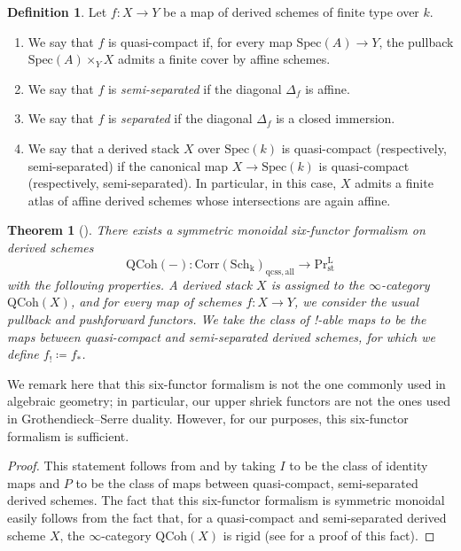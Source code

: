 \documentclass[oneside, hidelinks, 12pt, a4paper,reqno]{amsart}
\theoremstyle{plain}
\newtheorem{theorem}{Theorem}[section]
\theoremstyle{definition}
\newtheorem{definition}[definition]{Definition}
\theoremstyle{plain}
\newcommand{\rL}{\mathrm L}
\newcommand{\Spec}{\mathrm{Spec}}
\newcommand{\cat}{$\infty$-category }
\newcommand{\LPr}{\mathrm{Pr}^\rL}
\newcommand{\Qcoh}{\mathrm{QCoh}}
\begin{document}
\begin{definition}
    Let $f\colon X \to Y$ be a map of derived schemes of finite type over $k$. 
    \begin{enumerate}
        \item We say that $f$ is quasi-compact if, for every map $\Spec(A) \to Y$, the pullback $\Spec(A)\times_{Y}X$ admits a finite cover by affine schemes.
        \item We say that $f$ is \emph{semi-separated} if the diagonal $\Delta_f$ is affine.
        \item We say that $f$ is \emph{separated} if the diagonal $\Delta_f$ is a closed immersion. 
        \item We say that a derived stack $X$ over $\Spec(k)$ is quasi-compact (respectively, semi-separated) if the canonical map $X \to \Spec(k)$ is quasi-compact (respectively, semi-separated). In particular, in this case, $X$ admits a finite atlas of affine derived schemes whose intersections are again affine.
    \end{enumerate}
\end{definition}

\begin{theorem}[{\cite[Theorem 8.11]{scholze2025sixfunctorformalisms}}]
\label{thm:6-functor-for-qc-qs-schemes}
    There exists a symmetric monoidal six-functor formalism on derived schemes
    \[
    \Qcoh(-)\colon \mathrm{Corr(Sch_{k})}_{\mathrm{qcss, all}} \to \LPr_{\mathrm{st}}
    \]
    with the following properties. A derived stack $X$ is assigned to the \cat $\mathrm{QCoh}(X)$, and for every map of schemes $f\colon X \to Y$, we consider the usual pullback and pushforward functors. We take the class of !-able maps to be the maps between quasi-compact and semi-separated derived schemes, for which we define $f_{!} \coloneqq f_{\ast}$.
\end{theorem}

We remark here that this six-functor formalism is not the one commonly used in algebraic geometry; in particular, our upper shriek functors are not the ones used in Grothendieck--Serre duality. However, for our purposes, this six-functor formalism is sufficient.

\begin{proof}
    This statement follows from \cite[Proposition 1.3.13]{montagnani2025axiomaticapproachanalytic1affineness} and \cite[Proposition A.5.10]{mann2022padic6functorformalismrigidanalytic} by taking $I$ to be the class of identity maps and $P$ to be the class of maps between quasi-compact, semi-separated derived schemes. The fact that this six-functor formalism is symmetric monoidal easily follows from the fact that, for a quasi-compact and semi-separated derived scheme $X$, the \cat $\Qcoh(X)$ is rigid (see \cite[Proposition 1.3.17]{montagnani2025axiomaticapproachanalytic1affineness} for a proof of this fact).
\end{proof}
\end{document}
